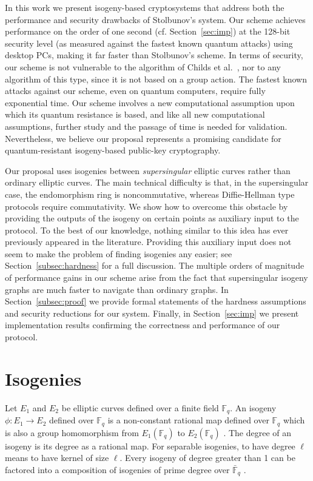 \documentclass[envcountsect,envcountsame,runningheads]{llncs}   %
\newcommand{\FF}{{\mathbb{F}}}
\begin{document}
In this work we present isogeny-based cryptosystems that address both
the performance and security drawbacks of Stolbunov's system. Our
scheme achieves performance on the order of one second
(cf. Section~\ref{sec:imp}) at the 128-bit security level (as measured
against the fastest known quantum attacks) using
desktop PCs, making it far faster than Stolbunov's scheme. In terms of
security, our scheme is not vulnerable to the algorithm of Childs et
al.~\cite{CJS}, nor to any algorithm of this type, since it is not
based on a group action. The fastest known attacks against our scheme,
even on quantum computers, require fully exponential time. Our scheme
involves a new computational assumption upon which its quantum resistance
is based, and like all new computational assumptions,
further study and the passage of time is needed for
validation. Nevertheless, we believe our proposal represents
a promising candidate for quantum-resistant isogeny-based public-key
cryptography.

Our proposal uses isogenies between \emph{supersingular} elliptic
curves rather than ordinary elliptic curves. The main technical
difficulty is that, in the supersingular case, the endomorphism ring
is noncommutative, whereas Diffie-Hellman type protocols require
commutativity. We show how to overcome this obstacle by providing the
outputs of the isogeny on certain points as auxiliary input to the
protocol. To the best of our knowledge, nothing
similar to this idea has ever previously appeared in the
literature. Providing this auxiliary input does not seem to
make the problem of finding isogenies any easier; see
Section~\ref{subsec:hardness} for a full discussion. The multiple
orders of magnitude of performance gains in our scheme arise from the
fact that supersingular isogeny graphs are much faster to navigate
than ordinary graphs. In Section~\ref{subsec:proof} we provide formal
statements of the hardness assumptions and security reductions for our
system. Finally, in Section~\ref{sec:imp} we present implementation
results confirming the correctness and performance of our protocol.


\section{Isogenies}\label{isogenies}
Let $E_1$ and $E_2$ be elliptic curves defined over a finite field
$\FF_q$.
An isogeny $\phi: E_1 \rightarrow E_2$ defined over $\FF_q$ is a
non-constant rational map defined over $\FF_q$ which is also a group
homomorphism from $E_1(\FF_q)$ to $E_2(\FF_q)$ \cite[III.4]{Sil}. The
degree of an isogeny is its degree as a rational map.  For separable
isogenies, to have degree $\ell$ means to have kernel of size $\ell$.
Every isogeny of degree greater than 1 can be factored into a
composition of isogenies of prime degree over $\bar{\FF}_q$
\cite{Couv}.
\end{document}
